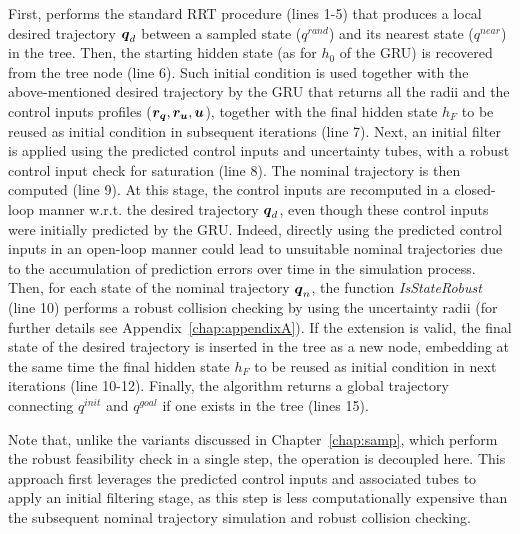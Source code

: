 First,  performs the standard RRT procedure (lines 1-5) that produces a local desired trajectory $\boldsymbol{q}_d$ between a sampled state (${q}^{rand}$) and its nearest state (${q}^{near}$) in the tree. 
Then, the starting hidden state (as for $h_{0}$ of the GRU) is recovered from the tree node (line 6).
Such initial condition is used together with the above-mentioned desired trajectory by the GRU that returns all the radii and the control inputs profiles ($\boldsymbol{r_q},\boldsymbol{r_u},\boldsymbol{u}$), together with the final hidden state $h_{F}$ to be reused as initial condition in subsequent iterations (line 7).
Next, an initial filter is applied using the predicted control inputs and uncertainty tubes, with a robust control input check for saturation (line 8).
The nominal trajectory is then computed (line 9). 
At this stage, the control inputs are recomputed in a closed-loop manner w.r.t. the desired trajectory $\boldsymbol{q}_d$, even though these control inputs were initially predicted by the GRU.
Indeed, directly using the predicted control inputs in an open-loop manner could lead to unsuitable nominal trajectories due to the accumulation of prediction errors over time in the simulation process.
Then, for each state of the nominal trajectory $\boldsymbol{q}_{n}$, the function \emph{IsStateRobust} (line 10) performs a robust collision checking by using the uncertainty radii (for further details see Appendix~\ref{chap:appendixA}).
If the extension is valid, the final state of the desired trajectory is inserted in the tree as a new node, embedding at the same time the final hidden state $h_{F}$ to be reused as initial condition in next iterations (line 10-12).
Finally, the algorithm returns a global trajectory connecting ${q}^{init}$ and ${q}^{goal}$ if one exists in the tree (lines 15).

Note that, unlike the  variants discussed in Chapter~\ref{chap:samp}, which perform the robust feasibility check in a single step, the operation is decoupled here. 
This approach first leverages the predicted control inputs and associated tubes to apply an initial filtering stage, as this step is less computationally expensive than the subsequent nominal trajectory simulation and robust collision checking.

